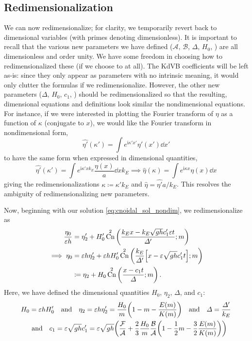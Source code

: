 \documentclass{jfm}
\let\Oldsubsection\subsection
\renewcommand{\subsection}{\FloatBarrier\Oldsubsection}
\DeclareMathOperator{\cn}{Cn}
\newcommand{\im}{\mathrm{i}}
\renewcommand*{\epsilon}{\varepsilon}
\begin{document}
\subsection{\label{sec:redim} Redimensionalization}
We can now redimensionalize; for clarity, we temporarily revert back to
dimensional variables (with primes denoting dimensionless).
It is important to recall that the various new parameters we have
defined ($\mathcal{A}$, $\mathcal{B}$, $\Delta$, $H_0$, \etc) are all
dimensionless and order unity.
We have some freedom in choosing how to redimensionalized these (if we
choose to at all).
The KdVB coefficients will be left as-is: since they only appear as
parameters with no intrinsic meaning, it would only clutter the formulas
if we redimensionalize.
However, the other new parameters ($\Delta$, $H_0$, $c_1$, \etc) should
be redimensionalized so that the resulting, dimensional equations and
definitions look similar the nondimensional equations.
For instance, if we were interested in plotting the Fourier transform of
$\eta$ as a function of $\kappa$ (conjugate to $x$), we would like the
Fourier transform in nondimensional form,
\[
  \hat{\eta'}(\kappa') = \int e^{\im \kappa' x'} \eta'(x') \dd{x'}
\]
to have the same form when expressed in dimensional quantities,
\[
  \hat{\eta'}(\kappa') = \int e^{\im \kappa' x k_E} \frac{\eta(x)}{a}
  \dd{x} k_E
  \implies \hat{\eta}(\kappa) = \int e^{\im \kappa x} \eta(x) \dd{x}
\]
giving the redimensionalizations  $\kappa \coloneqq \kappa' k_E$ and
$\hat{\eta} = \hat{\eta'} a/k_E$.
This resolves the ambiguity of redimensionalizing new parameters.

Now, beginning with our solution \cref{eq:cnoidal_sol_nondim}, we
redimensionalize as
\begin{equation}
  \begin{split}
  \frac{\eta_0}{\epsilon h} &= \eta_2' + H'_0 \cn^2\pqty{\frac{k_E x -
  k_E \sqrt{gh} c_1' \epsilon t}{\Delta'}; m}
  \\
  \implies
  \eta_0 &= \epsilon h \eta_2' + \epsilon h H'_0
  \cn^2\pqty{\frac{k_E}{\Delta'} \bqty{x - \epsilon \sqrt{gh} c_1' t}; m}
  \\
  &\coloneqq \eta_2 + H_0 \cn^2\pqty{\frac{x - c_1 t}{\Delta}; m} \,.
  \end{split}
\end{equation}
Here, we have defined the dimensional quantities $H_0$, $\eta_2$,
$\Delta$, and $c_1$:
\begin{gather}
  H_0 = \epsilon h H'_0
  \qq{and}
  \eta_2 = \epsilon h \eta_2' = \frac{H_0}{m} \pqty{1 - m -
    \frac{E(m)}{K(m)}}
  \qq{and}
  \Delta = \frac{\Delta'}{k_E}
  \\
  \qq{and}
  c_1 = \epsilon \sqrt{gh} c_1' = \epsilon \sqrt{gh} \pqty{
    \frac{\mathcal{F}}{\mathcal{A}} + \frac{2}{3} \frac{H_0}{m}
    \frac{\mathcal{B}}{\mathcal{A}} \pqty{1 - \frac{1}{2} m - \frac{3}{2}
    \frac{E(m)}{K(m)}} }
\end{gather}
\end{document}
